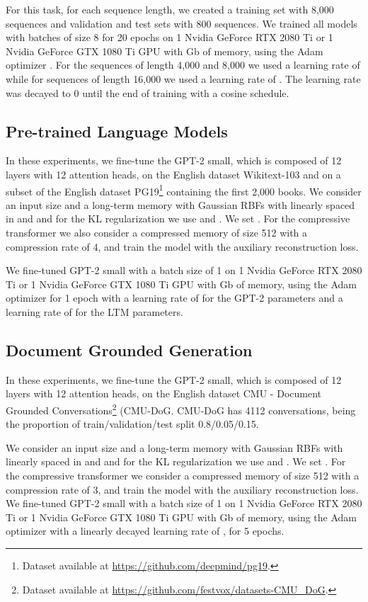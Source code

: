 \documentclass[11pt]{article}
\begin{document}
For this task, for each sequence length, we created a training set with 8,000 sequences and validation and test sets with 800 sequences. We trained all models with batches of size 8 for 20 epochs on 1 Nvidia GeForce RTX 2080 Ti or 1 Nvidia GeForce GTX 1080 Ti GPU with  Gb of memory, using the Adam optimizer \citep{kingma2015adam}. For the sequences of length 4,000 and 8,000 we used a learning rate of  while for sequences of length 16,000 we used a learning rate of . The learning rate was decayed to 0 until the end of training with a cosine schedule.

\subsection{Pre-trained Language Models}
\label{app:gpt2}
In these experiments, we fine-tune the GPT-2 small, which is composed of 12 layers with 12 attention heads, on the English dataset Wikitext-103 and on a subset of the English dataset PG19\footnote{Dataset available at \href{https://github.com/deepmind/pg19}{https://github.com/deepmind/pg19}.} containing the first 2,000 books. We consider an input size   and a long-term memory with  Gaussian RBFs  with  linearly spaced in  and  and for the KL regularization we use  and . We set . For the compressive transformer we also consider a compressed memory of size 512 with a compression rate of 4, and  train the model with the auxiliary reconstruction loss.

We fine-tuned GPT-2 small with a batch size of 1 on 1 Nvidia GeForce RTX 2080 Ti or 1 Nvidia GeForce GTX 1080 Ti GPU with  Gb of memory, using the Adam optimizer \citep{kingma2015adam} for 1 epoch with a learning rate of  for the GPT-2 parameters and a learning rate of  for the LTM parameters.


\subsection{Document Grounded Generation}
\label{app:dgd}
In these experiments, we fine-tune the GPT-2 small, which is composed of 12 layers with 12 attention heads, on the English dataset CMU - Document Grounded Conversations\footnote{Dataset available at \href{https://github.com/festvox/datasets-CMU_DoG}{https://github.com/festvox/datasets-CMU\_DoG}.} (CMU-DoG. CMU-DoG has 4112 conversations, being the proportion of train/validation/test split 0.8/0.05/0.15.

We consider an input size  and a long-term memory with  Gaussian RBFs  with  linearly spaced in  and  and for the KL regularization we use  and . We set . For the compressive transformer we consider a compressed memory of size 512 with a compression rate of 3, and  train the model with the auxiliary reconstruction loss.
We fine-tuned GPT-2 small with a batch size of 1 on 1 Nvidia GeForce RTX 2080 Ti or 1 Nvidia GeForce GTX 1080 Ti GPU with  Gb of memory, using the Adam optimizer \citep{kingma2015adam} with a linearly decayed learning rate of , for 5 epochs.
\end{document}
